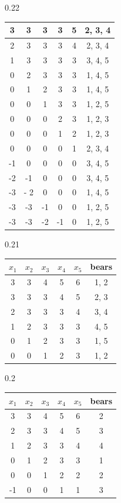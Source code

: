 \documentclass[10pt]{article}
\theoremstyle{definition}
\begin{document}
\begin{table}[t]
\begin{subtable}{0.22\textwidth}
\begin{tabular*}{\linewidth}[t]{@{\extracolsep{\fill}}ccccc|c}
3 &3 &3 &3 &5  & 2, 3, 4 \\
\hline
2 &3 &3 &3 &4  & 2, 3, 4 \\
1 &3 &3 &3 &3  & 3, 4, 5 \\
0 &2 &3 &3 &3  & 1, 4, 5 \\
\hline
0 &1 &2 &3 &3  & 1, 4, 5 \\
0 &0 &1 &3 &3  & 1, 2, 5\\
0 &0 &0 &2 &3  & 1, 2, 3 \\ 
\hline
0 &0 &0 &1 &2  & 1, 2, 3\\  
0 &0 &0 &0 &1 & 2, 3, 4 \\
-1 &0 &0 &0 &0 & 3, 4, 5 \\
\hline
-2 &-1 &0 &0 &0 & 3, 4, 5 \\
-3 &- 2& 0& 0& 0 & 1, 4, 5\\
-3 &-3 &-1 &0 &0 & 1, 2, 5\\
\hline
-3 &-3 &-2 &-1 &0 &1, 2, 5\\
\bottomrule
\end{tabular*}
\end{subtable}%
\hfill
\begin{subtable}{0.21\textwidth}
\begin{tabular*}{\linewidth}[t]{@{\extracolsep{\fill}}ccccc|c}
\toprule
$x_1$ & $x_2$ & $x_3$ & $x_4$ &  $x_5$ &  bears \\
\midrule
3 &3 &4 &5 &6 & 1, 2\\
3 &3 &3 &4 &5 & 2, 3\\
2 &3 &3 &3 &4 & 3, 4\\
\hline
1 &2 &3 &3 &3 & 4, 5 \\
0 &1 &2 &3 &3 & 1, 5\\
0 &0 &1 &2 &3 & 1, 2\\
\bottomrule
\end{tabular*}
\end{subtable}
\hfill
\begin{subtable}{0.2\textwidth}
\begin{tabular*}{\linewidth}[t]{@{\extracolsep{\fill}}ccccc|c} 
\toprule
$x_1$ & $x_2$ & $x_3$ & $x_4$  & $x_5$ &  bears \\
\midrule
3&  3&  4&  5&  6&  2\\
2&  3&  3&  4&  5&  3\\ 
1&  2&  3&  3&  4&  4\\ 
\hline
0&  1&  2&  3&  3&  1\\ 
0&  0&  1&  2&  2&  2\\ 
-1&  0&  0&  1&  1& 3\\ 

\end{tabular*}
\end{subtable}
\end{table}
\end{document}
